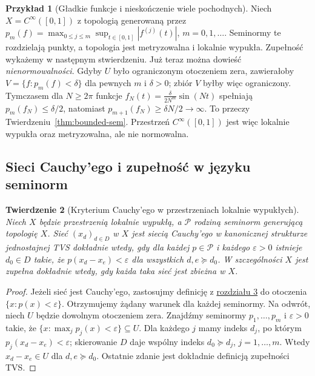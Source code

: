 \documentclass[11pt,a4paper]{article}
\numberwithin{equation}{section}
\theoremstyle{plain}
\newtheorem{twierdzenie}{Twierdzenie}[section]
\theoremstyle{definition}
\newtheorem{przyklad}[twierdzenie]{Przykład}
\theoremstyle{remark}
\begin{document}
\begin{przyklad}[Gładkie funkcje i nieskończenie wiele pochodnych]
\label{ex:smooth-frechet-preview}
Niech $X=C^\infty([0,1])$ z topologią generowaną przez
$p_m(f)=\max_{0\le j\le m}\sup_{t\in[0,1]}|f^{(j)}(t)|$,
$m=0,1,\ldots$. Seminormy te rozdzielają punkty,
a topologia jest metryzowalna i lokalnie wypukła.
Zupełność wykażemy w następnym stwierdzeniu. Już teraz
można dowieść \emph{nienormowalności}. Gdyby $U$ było ograniczonym
otoczeniem zera, zawierałoby
$V=\{f:p_m(f)<\delta\}$ dla pewnych $m$ i $\delta>0$;
zbiór $V$ byłby więc ograniczony. Tymczasem dla
$N\ge2\pi$ funkcje
$f_N(t)=\frac{\delta}{2N^m}\sin(Nt)$
spełniają $p_m(f_N)\le\delta/2$, natomiast
$p_{m+1}(f_N)\ge\delta N/2\to\infty$.
To przeczy Twierdzeniu~\ref{thm:bounded-sem}.
Przestrzeń $C^\infty([0,1])$ jest więc lokalnie wypukła
oraz metryzowalna, ale nie normowalna.
\end{przyklad}


\subsection{Sieci Cauchy'ego i zupełność w języku seminorm}

\begin{twierdzenie}[Kryterium Cauchy'ego w przestrzeniach lokalnie wypukłych]
\label{thm:lcs-cauchy}
Niech $X$ będzie przestrzenią lokalnie wypukłą, a
$\mathcal P$ rodziną seminorm generującą topologię $X$.
Sieć $(x_d)_{d\in D}$ w $X$ jest siecią Cauchy'ego
w kanonicznej strukturze jednostajnej TVS dokładnie wtedy,
gdy dla każdej $p\in\mathcal P$ i każdego $\varepsilon>0$
istnieje $d_0\in D$ takie, że $p(x_d-x_e)<\varepsilon$
dla wszystkich $d,e\succeq d_0$.
W szczególności $X$ jest zupełna dokładnie wtedy, gdy każda
taka sieć jest zbieżna w $X$.
\end{twierdzenie}
\begin{proof}
Jeżeli sieć jest Cauchy'ego, zastosujmy definicję z
\hyperref[sec:zupelnosc]{rozdziału 3} do otoczenia $\{x:p(x)<\varepsilon\}$.
Otrzymujemy żądany warunek dla każdej seminormy.
Na odwrót, niech $U$ będzie dowolnym otoczeniem zera.
Znajdźmy seminormy $p_1,\ldots,p_m$ i $\varepsilon>0$
takie, że $\{x:\max_jp_j(x)<\varepsilon\}\subseteq U$.
Dla każdego $j$ mamy indeks $d_j$, po którym
$p_j(x_d-x_e)<\varepsilon$; skierowanie $D$ daje wspólny
indeks $d_0\succeq d_j$, $j=1,\ldots,m$.
Wtedy $x_d-x_e\in U$ dla $d,e\succeq d_0$.
Ostatnie zdanie jest dokładnie definicją zupełności TVS.
\end{proof}
\end{document}

